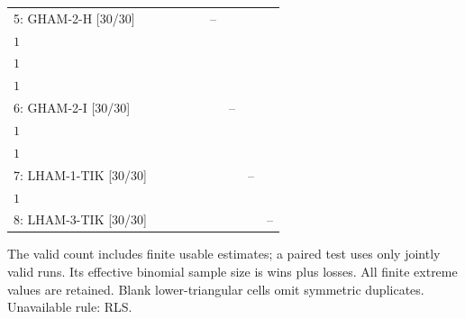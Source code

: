 \begin{table}[!htbp]
{\begin{tabular}{@{}l*{8}{c}@{}}
5: GHAM-2-H [30/30] &  &  &  &  & -- & \shortstack{$15{:}15{:}0$\\$1$} & \shortstack{$15{:}15{:}0$\\$1$} & \shortstack{$15{:}15{:}0$\\$1$} \\
6: GHAM-2-I [30/30] &  &  &  &  &  & -- & \shortstack{$15{:}15{:}0$\\$1$} & \shortstack{$15{:}15{:}0$\\$1$} \\
7: LHAM-1-TIK [30/30] &  &  &  &  &  &  & -- & \shortstack{$16{:}14{:}0$\\$1$} \\
8: LHAM-3-TIK [30/30] &  &  &  &  &  &  &  & -- \\
\bottomrule
\end{tabular}%
}
\endgroup
\par\smallskip
\begin{minipage}{\linewidth}\footnotesize
The valid count includes finite usable estimates; a paired test uses only jointly valid runs. Its effective binomial sample size is wins plus losses. All finite extreme values are retained. Blank lower-triangular cells omit symmetric duplicates.
Unavailable rule: RLS.
\end{minipage}
\end{table}

